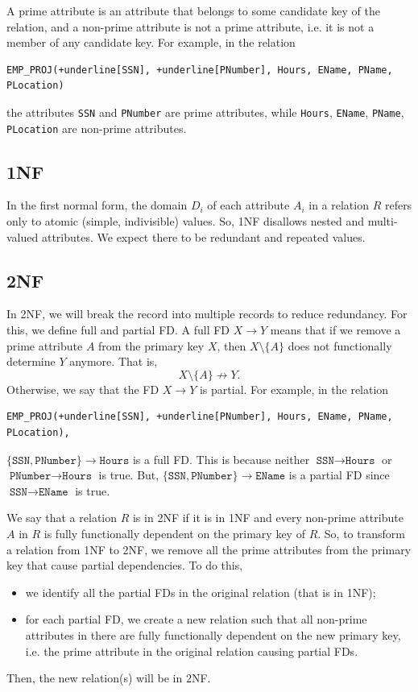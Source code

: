 \documentclass[a4paper, openany]{memoir}
\begin{document}
A prime attribute is an attribute that belongs to some candidate key of the relation, and a non-prime attribute is not a prime attribute, i.e. it is not a member of any candidate key. For example, in the relation
\begin{Verbatim}[commandchars=+\[\]]
EMP_PROJ(+underline[SSN], +underline[PNumber], Hours, EName, PName, PLocation)
\end{Verbatim}
the attributes \texttt{SSN} and \texttt{PNumber} are prime attributes, while \texttt{Hours}, \texttt{EName}, \texttt{PName}, \texttt{PLocation} are non-prime attributes.

\subsection{1NF}
In the first normal form, the domain $D_i$ of each attribute $A_i$ in a relation $R$ refers only to atomic (simple, indivisible) values. So, 1NF disallows nested and multi-valued attributes. We expect there to be redundant and repeated values.

\subsection{2NF}
In 2NF, we will break the record into multiple records to reduce redundancy. For this, we define full and partial FD. A full FD $X \to Y$ means that if we remove a prime attribute $A$ from the primary key $X$, then $X \setminus \{A\}$ does not functionally determine $Y$ anymore. That is,
\[X \setminus \{A\} \not\to Y.\]
Otherwise, we say that the FD $X \to Y$ is partial. For example, in the relation 
\begin{Verbatim}[commandchars=+\[\]]
EMP_PROJ(+underline[SSN], +underline[PNumber], Hours, EName, PName, PLocation),
\end{Verbatim}
$\{\texttt{SSN}, \texttt{PNumber}\} \to \texttt{Hours}$ is a full FD. This is because neither $\texttt{SSN} \to \texttt{Hours}$ or $\texttt{PNumber} \to \texttt{Hours}$ is true. But, $\{\texttt{SSN}, \texttt{PNumber}\} \to \texttt{EName}$ is a partial FD since $\texttt{SSN} \to \texttt{EName}$ is true.

We say that a relation $R$ is in 2NF if it is in 1NF and every non-prime attribute $A$ in $R$ is fully functionally dependent on the primary key of $R$. So, to transform a relation from 1NF to 2NF, we remove all the prime attributes from the primary key that cause partial dependencies. To do this, 
\begin{itemize}
    \item we identify all the partial FDs in the original relation (that is in 1NF);
    \item for each partial FD, we create a new relation such that all non-prime attributes in there are fully functionally dependent on the new primary key, i.e. the prime attribute in the original relation causing partial FDs.
\end{itemize}
Then, the new relation(s) will be in 2NF.
\end{document}
